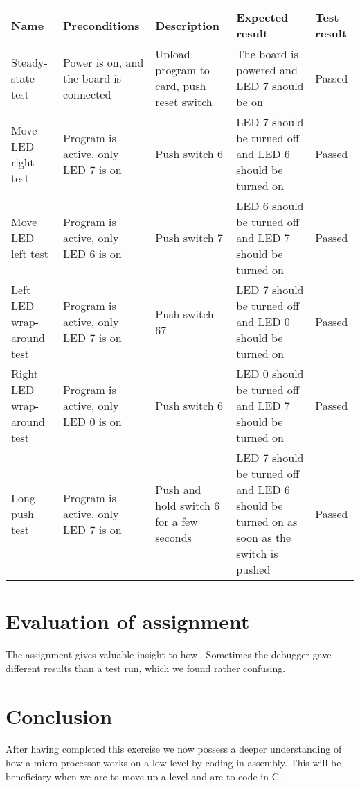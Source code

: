 \documentclass[a4paper,11pt]{article}
\begin{document}
\renewcommand{\arraystretch}{1.25} %
\begin{tabular}[pos]{|m{70pt}|m{90pt}|m{90pt}|m{100pt}|m{60pt}|}
\hline
\textbf{Name} 				& \textbf{Preconditions}				& \textbf{Description} 					& \textbf{Expected result} 													& \textbf{Test result} 		\\ \hline

Steady-state test			& Power is on, and the board is connected & Upload program to card, push reset switch 	& The board is powered and LED 7 should be on 									& Passed 				\\ \hline

Move LED right test			& Program is active, only LED 7 is on 		& Push switch 6						 	& LED 7 should be turned off and LED 6 should be turned on 							& Passed 				\\ \hline

Move LED left test			& Program is active, only LED 6 is on 		& Push switch 7						 	& LED 6 should be turned off and LED 7 should be turned on 							& Passed 				\\ \hline

Left LED wrap-around test		& Program is active, only LED 7 is on 		& Push switch 67					 	& LED 7 should be turned off and LED 0 should be turned on 							& Passed 				\\ \hline

Right LED wrap-around test	& Program is active, only LED 0 is on 		& Push switch 6						 	& LED 0 should be turned off and LED 7 should be turned on 							& Passed 				\\ \hline

Long push test				& Program is active, only LED 7 is on 		& Push and hold switch 6 for a few seconds 	& LED 7 should be turned off and LED 6 should be turned on as soon as the switch is pushed 	& Passed 				\\ \hline
\end{tabular}

\section{Evaluation of assignment}
The assignment gives valuable insight to how..
Sometimes the debugger gave different results than a test run, which we found rather confusing. 

\section{Conclusion}
After having completed this exercise we now possess a deeper understanding of how a micro processor works on a low level by coding in assembly. This will be beneficiary when we are to move up a level and are to code in C. 
\end{document}
